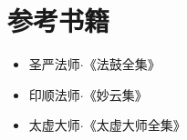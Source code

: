 \chapter{参考书籍}
\begin{itemize}
  \item 圣严法师$\cdot$《法鼓全集》
  \item 印顺法师$\cdot$《妙云集》
  \item 太虚大师$\cdot$《太虚大师全集》
\end{itemize}
